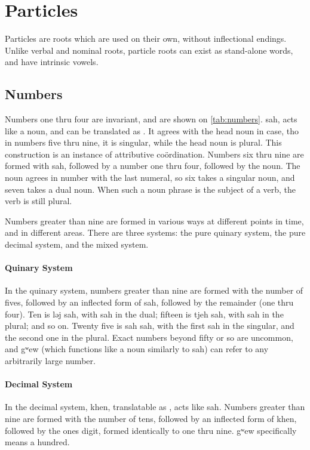 \section{Particles}
Particles are roots which are used on their own, without inflectional endings.
Unlike verbal and nominal roots, particle roots can exist as stand-alone words,
and have intrinsic vowels.

\subsection{Numbers}
Numbers one thru four are invariant, and are shown on \cref{tab:numbers}. {\ll
    sah}, acts like a noun, and can be translated as . It
agrees with the head noun in case, tho in numbers five thru nine, it is
singular, while the head noun is plural. This construction is an instance of
attributive coördination. Numbers six thru nine are formed with {\ll sah},
followed by a number one thru four, followed by the noun. The noun agrees in
number with the last numeral, so six takes a singular noun, and seven takes a
dual noun. When such a noun phrase is the subject of a verb, the verb is still
plural.

Numbers greater than nine are formed in various ways at different points in
time, and in different areas. There are three systems: the pure quinary system,
the pure decimal system, and the mixed system.

\paragraph{Quinary System} In the quinary system, numbers greater than nine are
formed with the number of fives, followed by an inflected form of {\ll sah},
followed by the remainder (one thru four). Ten is {\ll ləj sah}, with {\ll sah}
in the dual; fifteen is {\ll tjeh sah}, with {\ll sah} in the plural; and so
on. Twenty five is {\ll sah sah}, with the first {\ll sah} in the singular, and
the second one in the plural. Exact numbers beyond fifty or so are uncommon,
and {\ll gʷew} (which functions like a noun similarly to {\ll sah}) can refer
to any arbitrarily large number.

\paragraph{Decimal System} In the decimal system, {\ll khen}, translatable as
, acts like {\ll sah}. Numbers greater than nine are formed
with the number of tens, followed by an inflected form of {\ll khen}, followed
by the ones digit, formed identically to one thru nine. {\ll gʷew} specifically
means a hundred.

